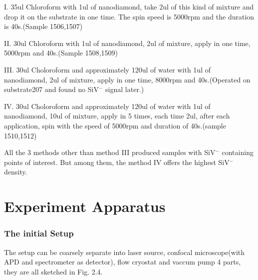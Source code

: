 I. 35ul Chloroform with 1ul of nanodiamond, take 2ul of this kind of mixture and drop it on the substrate in one time. The spin speed is 5000rpm and the duration is 40s.(Sample 1506,1507)

II. 30ul Chloroform with 1ul of nanodiamond, 2ul of mixture, apply in one time, 5000rpm and 40s.(Sample 1508,1509)

III. 30ul Choloroform and approximately 120ul of water with 1ul of nanodiamond, 2ul of mixture, apply in one time, 8000rpm and 40s.(Operated on substrate207 and found no SiV$^{-}$ signal later.)

IV. 30ul Choloroform and approximately 120ul of water with 1ul of nanodiamond, 10ul of mixture, apply in 5 times, each time 2ul, after each application, spin with the speed of 5000rpm and  duration of 40s.(sample 1510,1512)

All the 3 methods other than method III produced samples with SiV$^{-}$ containing points of interest. But among them, the method IV offers the highest SiV$^{-}$ density.
 

\section[experiment apparatus]{Experiment Apparatus}

\subsubsection{The initial Setup} 

The setup can be coarsely separate into laser source, confocal microscope(with APD and spectrometer as detector), flow cryostat and vaccum pump 4 parts, they are all sketched in Fig. 2.4.

